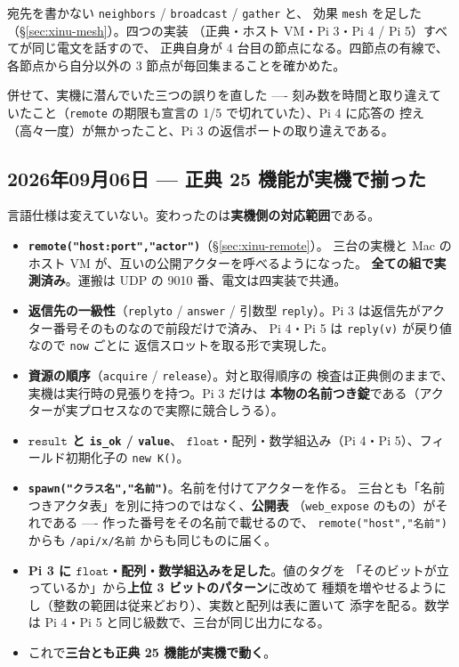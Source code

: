 \documentclass[11pt,a4paper]{ltjsarticle}
\newcommand{\ty}[1]{\ensuremath{\mathtt{#1}}}
\begin{document}
宛先を書かない \texttt{neighbors} / \texttt{broadcast} / \texttt{gather} と、
効果 \texttt{mesh} を足した（\S\ref{sec:xinu-mesh}）。四つの実装
（正典・ホスト VM・Pi 3・Pi 4 / Pi 5）すべてが同じ電文を話すので、
正典自身が 4 台目の節点になる。四節点の有線で、各節点から自分以外の
3 節点が毎回集まることを確かめた。

併せて、実機に潜んでいた三つの誤りを直した ---- 刻み数を時間と取り違えて
いたこと（\texttt{remote} の期限も宣言の 1/5 で切れていた）、Pi 4 に応答の
控え（高々一度）が無かったこと、Pi 3 の返信ポートの取り違えである。

\subsection{2026年09月06日 --- 正典 25 機能が実機で揃った}

言語仕様は変えていない。変わったのは\textbf{実機側の対応範囲}である。

\begin{itemize}
\item \textbf{\texttt{remote("host:port","actor")}}（\S\ref{sec:xinu-remote}）。
  三台の実機と Mac のホスト VM が、互いの公開アクターを呼べるようになった。
  \textbf{全ての組で実測済み}。運搬は UDP の 9010 番、電文は四実装で共通。
\item \textbf{返信先の一級性}（\texttt{replyto} / \texttt{answer} / 引数型
  \texttt{reply}）。Pi 3 は返信先がアクター番号そのものなので前段だけで済み、
  Pi 4・Pi 5 は \texttt{reply(v)} が戻り値なので \texttt{now} ごとに
  返信スロットを取る形で実現した。
\item \textbf{資源の順序}（\texttt{acquire} / \texttt{release}）。対と取得順序の
  検査は正典側のままで、実機は実行時の見張りを持つ。Pi 3 だけは
  \textbf{本物の名前つき錠}である（アクターが実プロセスなので実際に競合しうる）。
\item \textbf{\ty{result} と \texttt{is\_ok} / \texttt{value}}、
  \ty{float}・配列・数学組込み（Pi 4・Pi 5）、フィールド初期化子の \texttt{new K()}。
\item \textbf{\texttt{spawn("クラス名","名前")}}。名前を付けてアクターを作る。
  三台とも「名前つきアクタ表」を別に持つのではなく、\textbf{公開表}
  （\texttt{web\_expose} のもの）がそれである ---- 作った番号をその名前で載せるので、
  \texttt{remote("host","名前")} からも \texttt{/api/x/名前} からも同じものに届く。
\item \textbf{Pi 3 に \ty{float}・配列・数学組込みを足した}。値のタグを
  「そのビットが立っているか」から\textbf{上位 3 ビットのパターン}に改めて
  種類を増やせるようにし（整数の範囲は従来どおり）、実数と配列は表に置いて
  添字を配る。数学は Pi 4・Pi 5 と同じ級数で、三台が同じ出力になる。
\item これで\textbf{三台とも正典 25 機能が実機で動く}。
\end{itemize}
\end{document}
